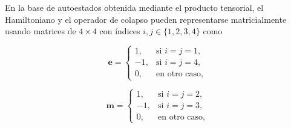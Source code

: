 





En la base de autoestados obtenida mediante el producto tensorial, el Hamiltoniano y el operador de colapso pueden representarse matricialmente usando matrices de \(4 \times 4\) con índices \(i, j \in \{1, 2, 3, 4\}\) como

\begin{equation} \nonumber
    \mathbf{e} =
    \begin{cases}
        1, & \text{si } i = j = 1, \\
        -1, & \text{si } i = j = 4, \\
        0, & \text{en otro caso,}
    \end{cases}
\end{equation}

\begin{equation} \nonumber
    \mathbf{m} =
    \begin{cases}
        1, & \text{si } i = j = 2, \\
        -1, & \text{si } i = j = 3, \\
        0, & \text{en otro caso,}
    \end{cases}
\end{equation}

